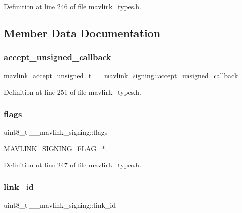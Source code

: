 Definition at line 246 of file mavlink\+\_\+types.\+h.



\subsection{Member Data Documentation}
\mbox{\label{struct____mavlink__signing_a74f675ae2e09c5a793c06d5005cd7d1b}} 
\subsubsection{\texorpdfstring{accept\_unsigned\_callback}{accept\_unsigned\_callback}}
{\footnotesize\ttfamily \mbox{\hyperlink{include__v2_80_2mavlink__types_8h_ae34bd7a529f7175ab3dcfab0ba5b0c0d}{mavlink\+\_\+accept\+\_\+unsigned\+\_\+t}} \+\_\+\+\_\+mavlink\+\_\+signing\+::accept\+\_\+unsigned\+\_\+callback}



Definition at line 251 of file mavlink\+\_\+types.\+h.

\mbox{\label{struct____mavlink__signing_a5e08957249da64329f7ee29c1c503516}} 
\subsubsection{\texorpdfstring{flags}{flags}}
{\footnotesize\ttfamily uint8\+\_\+t \+\_\+\+\_\+mavlink\+\_\+signing\+::flags}



M\+A\+V\+L\+I\+N\+K\+\_\+\+S\+I\+G\+N\+I\+N\+G\+\_\+\+F\+L\+A\+G\+\_\+$\ast$. 



Definition at line 247 of file mavlink\+\_\+types.\+h.

\mbox{\label{struct____mavlink__signing_a03d44bb3079f7af6924d6868846ccc57}} 
\subsubsection{\texorpdfstring{link\_id}{link\_id}}
{\footnotesize\ttfamily uint8\+\_\+t \+\_\+\+\_\+mavlink\+\_\+signing\+::link\+\_\+id}



